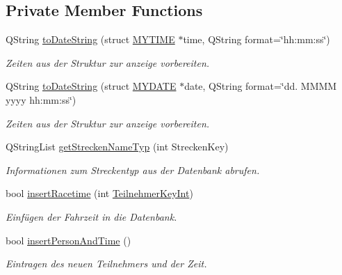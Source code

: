 \subsection*{Private Member Functions}
\begin{CompactItemize}
\item 
QString \hyperlink{class_r_f_i_d_input_dialog_f4cc582a23571818a7fa8c796806107f}{toDateString} (struct \hyperlink{struct_m_y_t_i_m_e}{MYTIME} $\ast$time, QString format=\char`\"{}hh:mm:ss\char`\"{})
\begin{CompactList}\small\item\em Zeiten aus der Struktur zur anzeige vorbereiten. \item\end{CompactList}\item 
QString \hyperlink{class_r_f_i_d_input_dialog_20e43f0e0b5830c72b04031d80ed4f08}{toDateString} (struct \hyperlink{struct_m_y_d_a_t_e}{MYDATE} $\ast$date, QString format=\char`\"{}dd. MMMM yyyy hh:mm:ss\char`\"{})
\begin{CompactList}\small\item\em Zeiten aus der Struktur zur anzeige vorbereiten. \item\end{CompactList}\item 
QStringList \hyperlink{class_r_f_i_d_input_dialog_a39510d98f5b5fb27dedf20efb7cf415}{getStreckenNameTyp} (int StreckenKey)
\begin{CompactList}\small\item\em Informationen zum Streckentyp aus der Datenbank abrufen. \item\end{CompactList}\item 
bool \hyperlink{class_r_f_i_d_input_dialog_3f2a6693dd90d3a2308decf4dcd122dd}{insertRacetime} (int \hyperlink{class_r_f_i_d_input_dialog_557be7292bf8509e793dc17e79d18e75}{TeilnehmerKeyInt})
\begin{CompactList}\small\item\em Einfügen der Fahrzeit in die Datenbank. \item\end{CompactList}\item 
bool \hyperlink{class_r_f_i_d_input_dialog_5213121582a03ad6c9e78d1915729937}{insertPersonAndTime} ()
\begin{CompactList}\small\item\em Eintragen des neuen Teilnehmers und der Zeit. \item\end{CompactList}\item 

\end{CompactItemize}
